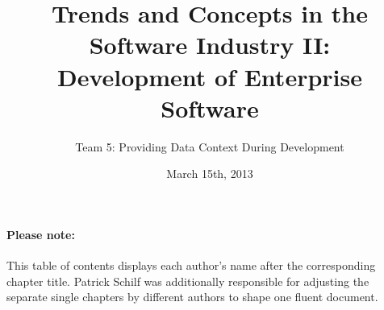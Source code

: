 \documentclass[runningheads]{llncs}
\begin{document}
\mainmatter
\title{Trends and Concepts in the Software Industry II: \\ Development of Enterprise Software}
\author{Team 5: Providing Data Context During Development}
\date{March 15th, 2013}
\maketitle

\setcounter{tocdepth}{2} 

\newpage

\tableofcontents

\paragraph{Please note:} This table of contents displays each author's name after the corresponding chapter title. Patrick Schilf was additionally responsible for adjusting the separate single chapters by different authors to shape one fluent document.

\newpage




























\end{document}
